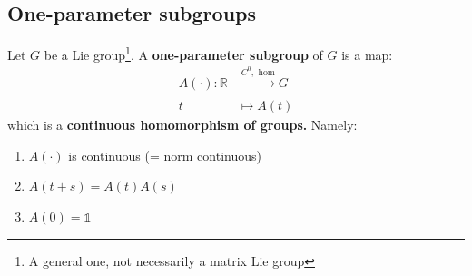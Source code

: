 \documentclass[../main.tex]{subfiles}
\begin{document}
\subsection{One-parameter subgroups}
\begin{definition}
Let $G$ be a Lie group\footnote{A general one, not necessarily a matrix Lie group}. A \textbf{one-parameter subgroup} of $G$ is a map:
\begin{align*}
A(\cdot):\mathbb{R}&\xrightarrow[]{C^0, \textrm{ hom}}G\\
t&\longmapsto A(t)
\end{align*}
which is a \textbf{continuous homomorphism of groups.} Namely:
\renewcommand{\labelenumi}{\Roman{enumi})}
\begin{enumerate}
    \item $A(\cdot)$ is continuous (= norm continuous)
    \item $A(t+s)=A(t)A(s)$
    \item $A(0)=\mathbb{1}$
\end{enumerate}
\end{definition}
\end{document}
